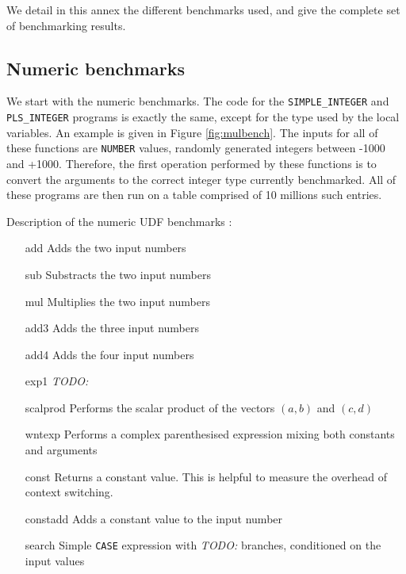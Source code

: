 \documentclass[twoside,11pt,a4paper]{article}
\newcommand{\todo}[1]{\textit{TODO: #1}}
\newcommand{\pls}[1]{\small\texttt{#1}\normalsize}
\newcommand{\plstype}[1]{\pls{#1}}
\newcommand{\oranum}{\plstype{NUMBER}}
\newcommand{\plsi}{\plstype{PLS\_INTEGER}}
\newcommand{\simpleint}{\plstype{SIMPLE\_INTEGER}}
\newcommand{\bench}[1]{\textsf{#1}}
\begin{document}
We detail in this annex the different benchmarks used, and give the complete set of benchmarking results.

\subsection*{Numeric benchmarks}

We start with the numeric benchmarks. The code for the \simpleint{} and \plsi{} programs is exactly the same, except for the type used by the local variables. An example is given in Figure \ref{fig:mulbench}. The inputs for all of these functions are \oranum{} values, randomly generated integers between -1000 and +1000. Therefore, the first operation performed by these functions is to convert the arguments to the correct integer type currently benchmarked. All of these programs are then run on a table comprised of 10 millions such entries.

\vspace{5mm}
Description of the numeric UDF benchmarks :
\begin{itemize}
\item[\bench{add}] Adds the two input numbers
\item[\bench{sub}] Substracts the two input numbers
\item[\bench{mul}] Multiplies the two input numbers
\item[\bench{add3}] Adds the three input numbers
\item[\bench{add4}] Adds the four input numbers
\item[\bench{exp1}] \todo{}
\item[\bench{scalprod}] Performs the scalar product of the vectors $(a, b)$ and $(c, d)$
\item[\bench{wntexp}] Performs a complex parenthesised expression mixing both constants and arguments
\item[\bench{const}] Returns a constant value. This is helpful to measure the overhead of context switching.
\item[\bench{constadd}] Adds a constant value to the input number
\item[\bench{search}] Simple \pls{CASE} expression with \todo{} branches, conditioned on the input values
\end{itemize}
\end{document}
